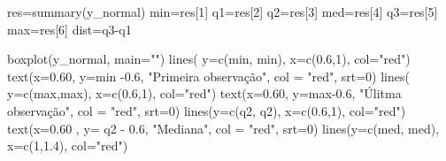 \documentclass[
]{book}
\newenvironment{Shaded}{\begin{snugshade}}{\end{snugshade}}
\newcommand{\AttributeTok}[1]{\textcolor[rgb]{0.77,0.63,0.00}{#1}}
\newcommand{\DecValTok}[1]{\textcolor[rgb]{0.00,0.00,0.81}{#1}}
\newcommand{\FloatTok}[1]{\textcolor[rgb]{0.00,0.00,0.81}{#1}}
\newcommand{\FunctionTok}[1]{\textcolor[rgb]{0.00,0.00,0.00}{#1}}
\newcommand{\NormalTok}[1]{#1}
\newcommand{\OtherTok}[1]{\textcolor[rgb]{0.56,0.35,0.01}{#1}}
\newcommand{\SpecialCharTok}[1]{\textcolor[rgb]{0.00,0.00,0.00}{#1}}
\newcommand{\StringTok}[1]{\textcolor[rgb]{0.31,0.60,0.02}{#1}}
\begin{document}
\begin{Shaded}
\begin{Highlighting}[]
\NormalTok{res}\OtherTok{=}\FunctionTok{summary}\NormalTok{(y\_normal)}
\NormalTok{min}\OtherTok{=}\NormalTok{res[}\DecValTok{1}\NormalTok{]}
\NormalTok{q1}\OtherTok{=}\NormalTok{res[}\DecValTok{2}\NormalTok{]}
\NormalTok{q2}\OtherTok{=}\NormalTok{res[}\DecValTok{3}\NormalTok{]}
\NormalTok{med}\OtherTok{=}\NormalTok{res[}\DecValTok{4}\NormalTok{]}
\NormalTok{q3}\OtherTok{=}\NormalTok{res[}\DecValTok{5}\NormalTok{]}
\NormalTok{max}\OtherTok{=}\NormalTok{res[}\DecValTok{6}\NormalTok{]}
\NormalTok{dist}\OtherTok{=}\NormalTok{q3}\SpecialCharTok{{-}}\NormalTok{q1}


\FunctionTok{boxplot}\NormalTok{(y\_normal, }\AttributeTok{main=}\StringTok{""}\NormalTok{)}
\FunctionTok{lines}\NormalTok{( }\AttributeTok{y=}\FunctionTok{c}\NormalTok{(min, min), }\AttributeTok{x=}\FunctionTok{c}\NormalTok{(}\FloatTok{0.6}\NormalTok{,}\DecValTok{1}\NormalTok{), }\AttributeTok{col=}\StringTok{"red"}\NormalTok{) }
\FunctionTok{text}\NormalTok{(}\AttributeTok{x=}\FloatTok{0.60}\NormalTok{, }\AttributeTok{y=}\NormalTok{min }\SpecialCharTok{{-}}\FloatTok{0.6}\NormalTok{, }\StringTok{"Primeira observação"}\NormalTok{, }\AttributeTok{col =} \StringTok{"red"}\NormalTok{, }\AttributeTok{srt=}\DecValTok{0}\NormalTok{)}
\FunctionTok{lines}\NormalTok{( }\AttributeTok{y=}\FunctionTok{c}\NormalTok{(max,max), }\AttributeTok{x=}\FunctionTok{c}\NormalTok{(}\FloatTok{0.6}\NormalTok{,}\DecValTok{1}\NormalTok{), }\AttributeTok{col=}\StringTok{"red"}\NormalTok{) }
\FunctionTok{text}\NormalTok{(}\AttributeTok{x=}\FloatTok{0.60}\NormalTok{, }\AttributeTok{y=}\NormalTok{max}\FloatTok{{-}0.6}\NormalTok{, }\StringTok{"Úlitma observação"}\NormalTok{, }\AttributeTok{col =} \StringTok{"red"}\NormalTok{, }\AttributeTok{srt=}\DecValTok{0}\NormalTok{)}
\FunctionTok{lines}\NormalTok{(}\AttributeTok{y=}\FunctionTok{c}\NormalTok{(q2, q2),  }\AttributeTok{x=}\FunctionTok{c}\NormalTok{(}\FloatTok{0.6}\NormalTok{,}\DecValTok{1}\NormalTok{), }\AttributeTok{col=}\StringTok{"red"}\NormalTok{) }
\FunctionTok{text}\NormalTok{(}\AttributeTok{x=}\FloatTok{0.60}\NormalTok{ , }\AttributeTok{y=}\NormalTok{ q2 }\SpecialCharTok{{-}} \FloatTok{0.6}\NormalTok{, }\StringTok{"Mediana"}\NormalTok{, }\AttributeTok{col =} \StringTok{"red"}\NormalTok{, }\AttributeTok{srt=}\DecValTok{0}\NormalTok{)}
\FunctionTok{lines}\NormalTok{(}\AttributeTok{y=}\FunctionTok{c}\NormalTok{(med, med),  }\AttributeTok{x=}\FunctionTok{c}\NormalTok{(}\DecValTok{1}\NormalTok{,}\FloatTok{1.4}\NormalTok{), }\AttributeTok{col=}\StringTok{"red"}\NormalTok{) }

\end{Highlighting}
\end{Shaded}
\end{document}

